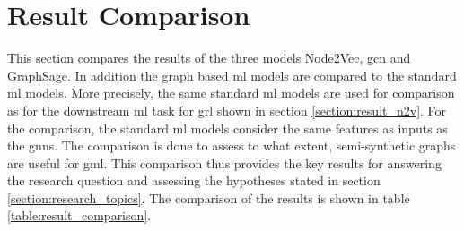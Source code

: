   \section{Result Comparison}
  \label{section:result_comp}

  This section compares the results of the three models Node2Vec, \acs{gcn} and
  GraphSage. In addition the graph based \acs{ml} models are compared to the 
  standard \acs{ml} models. More precisely, the same standard \acs{ml} models 
  are used for comparison as for the downstream \acs{ml} task for \acs{grl} 
  shown in section \ref{section:result_n2v}. For the comparison, the standard 
  \acs{ml} models consider the same features as inputs as the \acsp{gnn}. The 
  comparison is done to assess to what extent, semi-synthetic graphs are useful 
  for \acs{gml}. This comparison thus provides the key results for answering
  the research question and assessing the hypotheses stated in section 
  \ref{section:research_topics}. The comparison of the results is shown in table 
  \ref{table:result_comparison}.

  \begin{table}[h]
    \centering
    \caption{Result Comparison}
    \label{table:result_comparison}
  \end{table}

